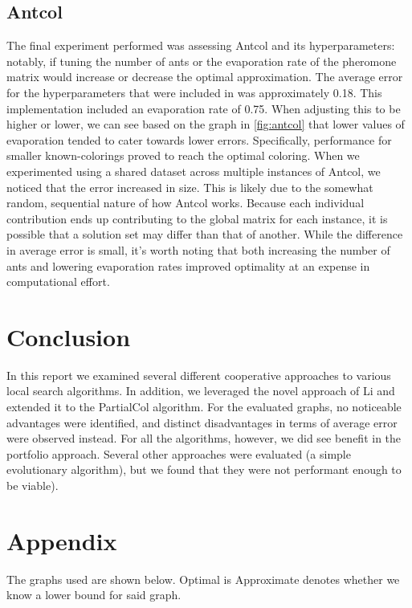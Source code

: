 \documentclass[runningheads]{llncs}
\begin{document}
\subsection{Antcol}

The final experiment performed was assessing Antcol and its hyperparameters: notably, if tuning the number of ants or the evaporation rate of the pheromone matrix would increase or decrease the optimal approximation. The average error for the hyperparameters that were included in \cite{10.5555/2851123} was approximately 0.18. This implementation included an evaporation rate of 0.75. When adjusting this to be higher or lower, we can see based on the graph in \ref{fig:antcol} that lower values of evaporation tended to cater towards lower errors. Specifically, performance for smaller known-colorings proved to reach the optimal coloring. When we experimented using a shared dataset across multiple instances of Antcol, we noticed that the error increased in size. This is likely due to the somewhat random, sequential nature of how Antcol works. Because each individual contribution ends up contributing to the global matrix for each instance, it is possible that a solution set may differ than that of another. While the difference in average error is small, it's worth noting that both increasing the number of ants and lowering evaporation rates improved optimality at an expense in computational effort.

\section{Conclusion}
In this report we examined several different cooperative approaches to various local search algorithms. In addition, we leveraged the novel approach of Li and extended it to the PartialCol algorithm. For the evaluated graphs, no noticeable advantages were identified, and distinct disadvantages in terms of average error were observed instead. For all the algorithms, however, we did see benefit in the portfolio approach. Several other approaches were evaluated (a simple evolutionary algorithm), but we found that they were not performant enough to be viable).


\section{Appendix}

The graphs used are shown below. Optimal is Approximate denotes whether we know a lower bound for said graph.
\end{document}
